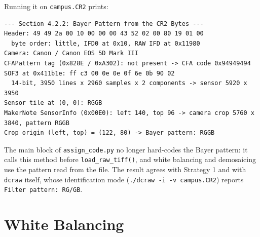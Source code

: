 \documentclass[a4paper]{article}
\begin{document}
Running it on \texttt{campus.CR2} prints:
\begin{lstlisting}[language={}, numbers=none]
--- Section 4.2.2: Bayer Pattern from the CR2 Bytes ---
Header: 49 49 2a 00 10 00 00 00 43 52 02 00 80 19 01 00
  byte order: little, IFD0 at 0x10, RAW IFD at 0x11980
Camera: Canon / Canon EOS 5D Mark III
CFAPattern tag (0x828E / 0xA302): not present -> CFA code 0x94949494
SOF3 at 0x411b1e: ff c3 00 0e 0e 0f 6e 0b 90 02
  14-bit, 3950 lines x 2960 samples x 2 components -> sensor 5920 x 3950
Sensor tile at (0, 0): RGGB
MakerNote SensorInfo (0x00E0): left 140, top 96 -> camera crop 5760 x 3840, pattern RGGB
Crop origin (left, top) = (122, 80) -> Bayer pattern: RGGB
\end{lstlisting}
The main block of \texttt{assign\_code.py} no longer hard-codes the Bayer pattern: it calls this method before \texttt{load\_raw\_tiff()}, and white balancing and demosaicing use the pattern read from the file. The result agrees with Strategy 1 and with \texttt{dcraw} itself, whose identification mode (\texttt{./dcraw -i -v campus.CR2}) reports \texttt{Filter pattern: RG/GB}.

\section{White Balancing}
\end{document}
